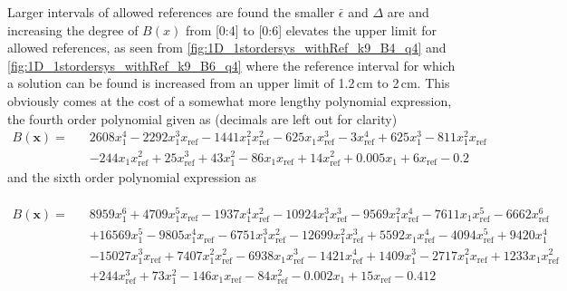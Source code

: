 Larger intervals of allowed references are found the smaller $\bar{\epsilon}$ and $\Delta$ are and increasing the degree of $B(x)$ from [0:4] to [0:6] elevates the upper limit for allowed references, as seen from \autoref{fig:1D_1stordersys_withRef_k9_B4_q4} and \ref{fig:1D_1stordersys_withRef_k9_B6_q4} where the reference interval for which a solution can be found is increased from an upper limit of 1.2\,cm to 2\,cm. This obviously comes at the cost of a somewhat more lengthy polynomial expression, the fourth order polynomial given as (decimals are left out for clarity)
\begin{align}
B(\textbf{x}) = \,\,\,\,\,&
2608 x_1^4 - 2292 x_1^3 x_\text{ref} - 1441 x_1^2 x_\text{ref}^2 - 625
 x_1 x_\text{ref}^3 - 3 x_\text{ref}^4 
 + 625 x_1^3 - 811 x_1^2 x_\text{ref} \nonumber\\
&- 244 x_1 x_\text{ref}^2 + 25 x_\text{ref}^3 + 43 x_1^2 
- 86 x_1 x_\text{ref} 
+ 14 x_\text{ref}^2 + 0.005 x_1 + 6 x_\text{ref} - 0.2\label{eq:B4_q4_e0001}
\end{align}
and the sixth order polynomial expression as\\ 

\textcolor{white}{phantom}
\vspace{-10mm}
\begin{align}
B(\mathbf{x}) = \,\,\,\,\,& 
8959  x_1^6 + 4709  x_1^5x_\text{ref} - 1937 x_1^4 x_\text{ref}^2 - 10924   x_1^3  x_\text{ref}^3 - 9569  x_1^2  x_\text{ref}^4 - 7611  x_1  x_\text{ref}^5 - 6662  x_\text{ref}^6 \nonumber\\
&+ 16569  x_1^5 - 9805  x_1^4  x_\text{ref} - 6751  x_1^3  x_\text{ref}^2 
- 12699  x_1^2  x_\text{ref}^3 + 5592  x_1  x_\text{ref}^4 - 4094  x_\text{ref}^5 
+ 9420  x_1^4 \nonumber\\
&- 15027  x_1^3  x_\text{ref} + 7407  x_1^2  x_\text{ref}^2 
- 6938  x_1  x_\text{ref}^3 - 1421  x_\text{ref}^4 + 1409  x_1^3 - 2717  x_1^2
  x_\text{ref} + 1233  x_1  x_\text{ref}^2 \nonumber\\
& + 244 x_\text{ref}^3 + 73  x_1^2 - 146
  x_1  x_\text{ref} - 84  x_\text{ref}^2 - 0.002  x_1 + 15  x_\text{ref} - 0.412\label{eq:B6_q4_e0001}
\end{align}





